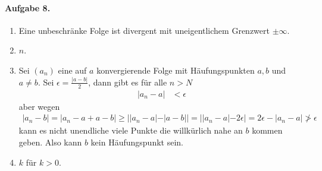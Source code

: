 \documentclass{article}
\begin{document}
\paragraph*{Aufgabe 8.}
\begin{enumerate}
    \item Eine unbeschr\"anke Folge ist divergent mit uneigentlichem Grenzwert $\pm\infty$. 

    \item $n$.

    \item Sei $(a_n)$ eine auf $a$ konvergierende Folge mit Häufungspunkten $a, b$ und $a \neq b$. Sei $\epsilon = \frac{|a - b|}{2}$, dann gibt es für alle $n > N$
    \begin{align*}
        |a_n - a| &< \epsilon
    \end{align*}
    aber wegen
    \begin{align*}
        |a_n - b| = |a_n - a + a - b| \geq ||a_n - a| - |a - b|| = ||a_n - a| - 2\epsilon| = 2\epsilon - |a_n - a| \not> \epsilon
    \end{align*}
    kann es nicht unendliche viele Punkte die willkürlich nahe an $b$ kommen geben. Also kann $b$ kein Häufungspunkt sein.

    \item $k$ für $k > 0$.
\end{enumerate}
\end{document}
